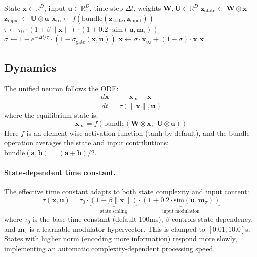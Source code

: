 \documentclass{article}
\newcommand{\bind}{\otimes}
\newcommand{\R}{\mathbb{R}}
\newcommand{\hvx}{\mathbf{x}}
\newcommand{\hvw}{\mathbf{W}}
\newcommand{\hvu}{\mathbf{U}}
\newcommand{\hvinput}{\mathbf{u}}
\newcommand{\xinf}{\mathbf{x}_\infty}
\begin{document}
\begin{algorithm}[t]
\caption{Unified HDC-LTC Neuron Forward Pass}
\label{alg:forward}
\begin{algorithmic}[1]
\REQUIRE State $\hvx \in \R^D$, input $\hvinput \in \R^D$, time step $\Delta t$, weights $\hvw, \hvu \in \R^D$
\STATE $\mathbf{z}_\text{state} \leftarrow \hvw \bind \hvx$ 
\STATE $\mathbf{z}_\text{input} \leftarrow \hvu \bind \hvinput$ 
\STATE $\xinf \leftarrow f(\text{bundle}(\mathbf{z}_\text{state}, \mathbf{z}_\text{input}))$ 
\STATE $\tau \leftarrow \tau_0 \cdot (1 + \beta \|\hvx\|) \cdot (1 + 0.2 \cdot \text{sim}(\hvinput, \mathbf{m}_\tau))$ 
\STATE $\sigma \leftarrow 1 - e^{-\Delta t / \tau} \cdot (1 - \sigma_\text{gate}(\hvx, \hvinput))$ 
\STATE $\hvx \leftarrow \sigma \cdot \xinf + (1 - \sigma) \cdot \hvx$ 
\RETURN $\hvx$
\end{algorithmic}
\end{algorithm}

\subsection{Dynamics}

The unified neuron follows the ODE:
\begin{equation}\label{eq:unified_ode}
    \frac{d\hvx}{dt} = \frac{\xinf - \hvx}{\tau(\|\hvx\|, \hvinput)}
\end{equation}
where the equilibrium state is:
\begin{equation}\label{eq:equilibrium}
    \xinf = f\!\left(\text{bundle}(\hvw \bind \hvx, \; \hvu \bind \hvinput)\right)
\end{equation}
Here $f$ is an element-wise activation function (tanh by default), and the bundle operation averages the state and input contributions: $\text{bundle}(\mathbf{a}, \mathbf{b}) = (\mathbf{a} + \mathbf{b}) / 2$.

\paragraph{State-dependent time constant.} The effective time constant adapts to both state complexity and input content:
\begin{equation}\label{eq:tau}
    \tau(\hvx, \hvinput) = \tau_0 \cdot \underbrace{(1 + \beta \|\hvx\|)}_{\text{state scaling}} \cdot \underbrace{(1 + 0.2 \cdot \text{sim}(\hvinput, \mathbf{m}_\tau))}_{\text{input modulation}}
\end{equation}
where $\tau_0$ is the base time constant (default 100ms), $\beta$ controls state dependency, and $\mathbf{m}_\tau$ is a learnable modulator hypervector. This is clamped to $[0.01, 10.0]$s. States with higher norm (encoding more information) respond more slowly, implementing an automatic complexity-dependent processing speed.
\end{document}
